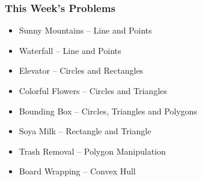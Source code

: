 \begin{frame}
  \frametitle{This Week's Problems}
  \begin{itemize}
    \item Sunny Mountains -- Line and Points
    \item Waterfall -- Line and Points
    \item Elevator -- Circles and Rectangles
    \item Colorful Flowers -- Circles and Triangles
    \item Bounding Box -- Circles, Triangles and Polygons
    \item Soya Milk -- Rectangle and Triangle
    \item Trash Removal -- Polygon Manipulation
    \item Board Wrapping -- Convex Hull
  \end{itemize}
\end{frame}
